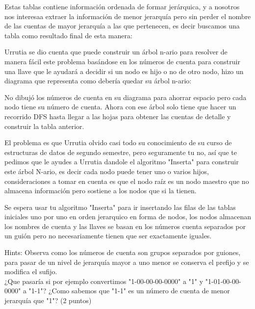 \documentclass{article}
\begin{document}
\begin{enumerate}
Estas tablas contiene información ordenada de formar jerárquica, y a nosotros nos interesaa extraer la información de menor jerarquía pero sin perder el nombre de las cuentas de mayor jerarquía a las que pertenecen, es decir buscamos una tabla como resultado final de esta manera:

\begin{figure}[H]
    \centering
    \shadowsize=0.8pt
    \fboxrule=0pt
    \fboxsep=0pt
    \color{lightgray}
    \color{black}
    \label{fig:12}
\end{figure}

Urrutia se dio cuenta que puede construir un árbol n-ario para resolver de manera fácil este problema basándose en los números de cuenta para construir una llave que le ayudará a decidir si un nodo es hijo o no de otro nodo, hizo un diagrama que representa como debería quedar su árbol n-ario:
\newpage
    
\begin{figure}[H]
    \centering
    \shadowsize=0.8pt
    \fboxrule=0pt
    \fboxsep=0pt
    \color{lightgray}
    \color{black}
    \label{fig:12}
\end{figure}

No dibujó los números de cuenta en su diagrama para ahorrar espacio pero cada nodo tiene su número de cuenta. Ahora con ese árbol solo tiene que hacer un recorrido DFS hasta llegar a las hojas para obtener las cuentas de detalle y construir la tabla anterior.

El problema es que Urrutia olvido casi todo su conocimiento de su curso de estructuras de datos de segundo semestre, pero seguramente tu no, así que te pedimos que le ayudes a Urrutia dandole el algoritmo "Inserta" para construir este árbol N-ario, es decir cada nodo puede tener uno o varios hijos, consideraciones a tomar en cuenta es que el nodo raíz es un nodo maestro que no almacena información pero sostiene a los nodos que si la tienen.

Se espera usar tu algoritmo "Inserta" para ir insertando las filas de las tablas iniciales uno por uno en orden jerarquico en forma de nodos, los nodos almacenan los nombres de cuenta y las llaves se basan en los números cuenta separados por un guión pero no necesariamente tienen que ser exactamente iguales.

Hints: Observa como los números de cuenta son grupos separados por guiones, para pasar de un nivel de jerarquía mayor a uno menor se conserva el prefijo y se modifica el sufijo. \\ ¿Que pasaría si por ejemplo convertimos "1-00-00-00-0000" a "1" y "1-01-00-00-0000" a "1-1"? ¿Como sabemos que "1-1" es un número de cuenta de menor jerarquía que "1"? (2 puntos)
\end{enumerate}
\end{document}
